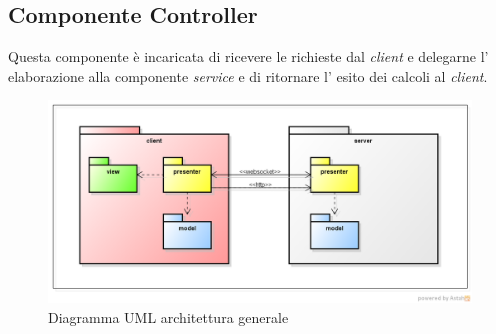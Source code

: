 \subsection{Componente Controller}
Questa componente è incaricata di ricevere le richieste dal \textit{client} e delegarne l' elaborazione alla componente \textit{service} e di ritornare l' esito dei calcoli al \textit{client}.
\begin{figure}[H] \centering \includegraphics[width=%
\textwidth]
{./other/MVPIntroduzione.png} \caption{Diagramma UML architettura generale}
\end{figure}